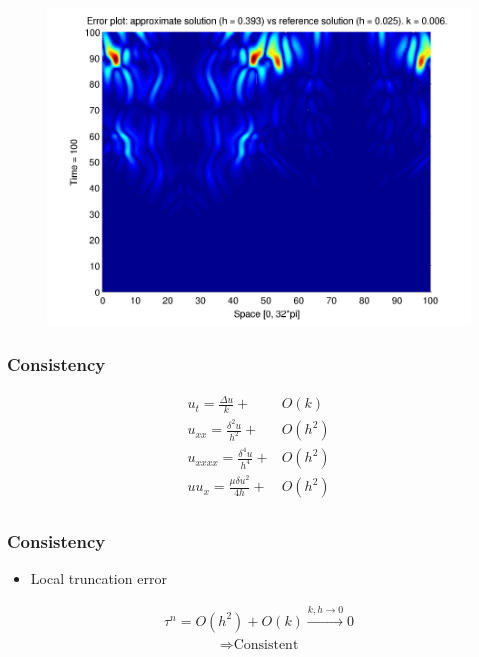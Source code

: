 \documentclass[screen]{beamer}
\begin{document}
\begin{frame}

\begin{figure}[htb]
\includegraphics[width=1\textwidth]{error_num_ref_t100_2nd.pdf}
\end{figure}

\end{frame}


\begin{frame}
\frametitle{Consistency}
\begin{align*}
u_t= \frac{\Delta u}{k} + &O(k) \\
u_{xx} = \frac{\delta^2 u}{h^2} + &O(h^2) \\
u_{xxxx} = \frac{\delta^4 u}{h^4} + &O(h^2) \\
uu_{x} = \frac{\mu \delta u^2}{4h} + &O(h^2) \\
\end{align*}

\end{frame}

\begin{frame}

\frametitle{Consistency}
\begin{itemize}
\item Local truncation error
\end{itemize}

\begin{align*}
\tau ^n = O(h^2) + O(k) \xrightarrow{k,h \to 0} 0
\end{align*}
\begin{align*}
\Rightarrow \textrm{Consistent}
\end{align*}

\end{frame}
\end{document}
